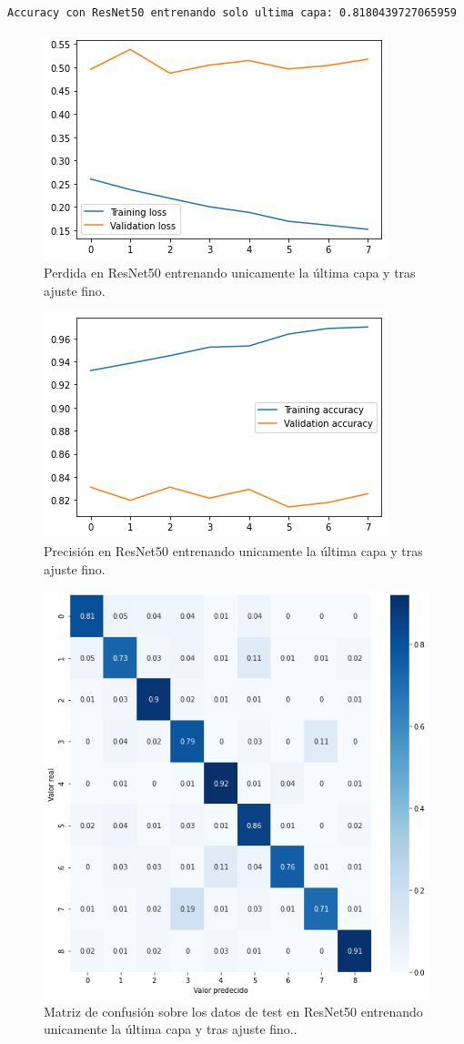 \begin{lstlisting}
Accuracy con ResNet50 entrenando solo ultima capa: 0.8180439727065959
\end{lstlisting}



\begin{figure}[H]
  \centering
  \includegraphics[width=0.5\linewidth]{Imagenes/entrenamiento_redes/ult/resnet_fine_loss.png}
  \caption{Perdida en ResNet50 entrenando unicamente la última capa y tras ajuste fino.}
\end{figure}

\begin{figure}[H]
  \centering
  \includegraphics[width=0.5\linewidth]{Imagenes/entrenamiento_redes/ult/resnet_fine_acc.png}
  \caption{Precisión en ResNet50 entrenando unicamente la última capa y tras ajuste fino.}
\end{figure}

\begin{figure}[H]
  \centering
  \includegraphics[width=0.5\linewidth]{Imagenes/entrenamiento_redes/ult/resnet_fine_matriz.png}
  \caption{Matriz de confusión sobre los datos de test en ResNet50 entrenando unicamente la última capa y tras ajuste fino..}
\end{figure}

